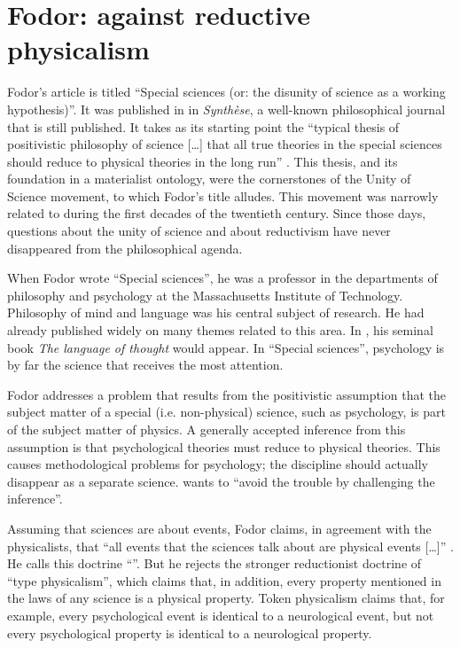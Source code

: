 \documentclass[output=paper]{langscibook}
\begin{document}
\section{Fodor: against reductive physicalism}
\label{sec:elffers:tokenphysicalism}

Fodor's article is titled ``Special sciences (or: the disunity of science as a working hypothesis)''. It was published in \citeyear{Fodor1974} in \emph{Synthèse}, a well-known philosophical journal that is still published. It takes as its starting point the ``typical thesis of positivistic philosophy of science […] that all true theories in the special sciences should reduce to physical theories in the long run'' \citep[97]{Fodor1974}. This thesis, and its foundation in a materialist ontology, were the cornerstones of the Unity of Science movement, to which Fodor's title alludes. This movement was narrowly related to  during the first decades of the twentieth century. Since those days, questions about the unity of science and about reductivism have never disappeared from the philosophical agenda.

When Fodor wrote ``Special sciences'', he was a professor in the departments of philosophy and psychology at the Massachusetts Institute of Technology. Philosophy of mind and language was his central subject of research. He had already published widely on many themes related to this area. In \citeyear{Fodor1975}, his seminal book \emph{The language of thought} would appear. In ``Special sciences'', psychology is by far the science that receives the most attention.

Fodor addresses a problem that results from the positivistic assumption that the subject matter of a special (i.e. non-physical) science, such as psychology, is part of the subject matter of physics. A generally accepted inference from this assumption is that psychological theories must reduce to physical theories. This causes methodological problems for psychology; the discipline should actually disappear as a separate science. \citet[98]{Fodor1974} wants to ``avoid the trouble by challenging the inference''.

Assuming that sciences are about events, Fodor claims, in agreement with the physicalists, that ``all events that the sciences talk about are physical events […]'' \citep[100]{Fodor1974}. He calls this doctrine ``''. But he rejects the stronger reductionist doctrine of ``type physicalism'', which claims that, in addition, every property mentioned in the laws of any science is a physical property. Token physicalism claims that, for example, every psychological event is identical to a neurological event, but not every psychological property is identical to a neurological property.
\end{document}
